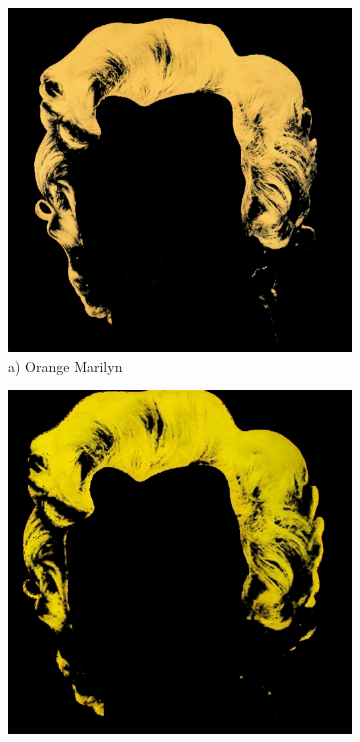\documentclass{article}
\begin{document}
\begin{figure}[htbp]
    \centering
    \begin{subfigure}[b]{0.19\textwidth}
        \includegraphics[width=\textwidth]{main_files/figure-latex/8_2_orange_marilyn_hair_extraction.jpg}
        \caption*{a) Orange Marilyn}
    \end{subfigure}
    \hfill
    \begin{subfigure}[b]{0.19\textwidth}
        \includegraphics[width=\textwidth]{main_files/figure-latex/9_2_red_marilyn_hair_extraction.jpg}

\end{subfigure}
\end{figure}
\end{document}
